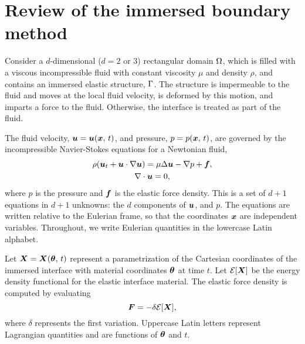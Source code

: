 \section{Review of the immersed boundary method} \label{sec:ib}

Consider a $d$-dimensional ($d=2$ or 3) rectangular domain $\Omega$, which is filled
with a viscous incompressible fluid with constant viscosity $\mu$ and density $\rho$, and
contains an immersed elastic structure, $\Gamma$. The structure is impermeable to the
fluid and moves at the local fluid velocity, is deformed by this motion, and imparts a
force to the fluid. Otherwise, the interface is treated as part of the fluid. 

The fluid velocity, $\boldsymbol{u} = \boldsymbol{u}(\boldsymbol{x},\,t)$, and pressure, $p = p(\boldsymbol{x},\,t)$, are governed by the
incompressible Navier-Stokes equations for a Newtonian fluid,
\begin{gather}
    \label{eq:ins-evol}
    \rho(\u_t + \u\cdot\grad\u) = \mu\Delta\u - \grad p + \f, \\
    \label{eq:ins-incomp}
    \div\u = 0,
\end{gather}
where $p$ is the pressure and $\boldsymbol{f}$ is the elastic force density. This is a set of $d+1$
equations in $d+1$ unknowns: the $d$ components of $\boldsymbol{u}$, and $p$. The equations are
written relative to the Eulerian frame, so that the coordinates $\boldsymbol{x}$ are independent
variables. Throughout, we write Eulerian quantities in the lowercase Latin alphabet.

Let $\boldsymbol{X}=\boldsymbol{X}(\boldsymbol{\theta},\,t)$ represent a parametrization of the Cartesian coordinates of the
immersed interface with material coordinates $\boldsymbol{\theta}$ at time $t$. Let $\mathcal{E}[\boldsymbol{X}]$ be the
energy density functional for the elastic interface material. The elastic force density
is computed by evaluating%
\begin{equation}
    \label{eq:forces}
    \boldsymbol{F} = -\delta \mathcal{E}[\boldsymbol{X}],
\end{equation}
where $\delta$ represents the first variation. Uppercase Latin letters represent
Lagrangian quantities and are functions of $\boldsymbol{\theta}$ and $t$.

